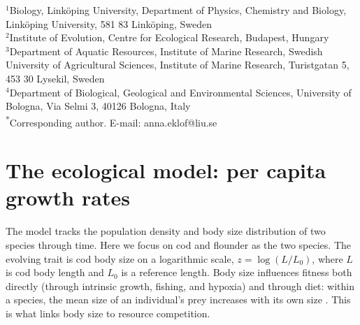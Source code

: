 \documentclass{article}
\title{\vspace{-1.5cm}{Supplementary Information \\ Eco-evolutionary dynamics hinder recovery \\ in harvested populations}}
\date{}
\author{Mikael Ohlsson\textsuperscript{1},
György Barabás\textsuperscript{1,2},
Max Lindmark\textsuperscript{3},\\
Michele Casini\textsuperscript{3,4},
Viktor Thunell\textsuperscript{3},
Valerio Bartolino\textsuperscript{3},
Mattias Sköld\textsuperscript{3},
Anna Eklöf\textsuperscript{1*}}
\begin{document}
\maketitle

$^1$Biology, Linköping University, Department of Physics, Chemistry and Biology, Linköping University, 581 83 Linköping, Sweden\\[1.2ex]%
$^2$Institute of Evolution, Centre for Ecological Research, Budapest, Hungary\\
$^3$Department of Aquatic Resources, Institute of Marine Research, Swedish University of Agricultural Sciences, Institute of Marine Research, Turistgatan 5, 453 30 Lysekil, Sweden\\[1.2ex]%
$^4$Department of Biological, Geological and Environmental Sciences, University of Bologna, Via Selmi 3, 40126 Bologna, Italy\\[1.2ex]%
\textsuperscript{*}Corresponding author. E-mail: anna.eklof@liu.se\\[2.0ex]%

\clearpage
\doublespacing



\section{The ecological model: per capita growth rates} \label{sec:si_ecoevo}

The model tracks the population density and body size distribution of two species through time. Here we focus on cod and flounder as the two species. The evolving trait is cod body size on a logarithmic scale, $z = \log(L/L_0)$, where $L$ is cod body length and $L_0$ is a reference length. Body size influences fitness both directly (through intrinsic growth, fishing, and hypoxia) and through diet: within a species, the mean size of an individual's prey increases with its own size \citep{Rossberg2013, Schneideretal2016}. This is what links body size to resource competition.
\end{document}
